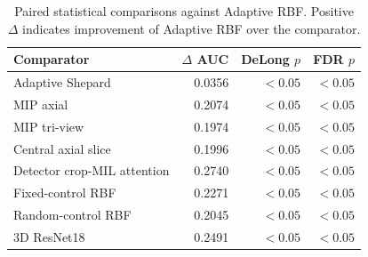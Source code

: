\documentclass[preprint,12pt]{elsarticle}
\begin{document}
\begin{table}[t]
\centering
\caption{Paired statistical comparisons against Adaptive RBF. Positive $\Delta$ indicates improvement of Adaptive RBF over the comparator.}
\label{tab:stats}
\begin{tabular}{lrrr}
\toprule
Comparator & $\Delta$ AUC & DeLong $p$ & FDR $p$ \\
\midrule
Adaptive Shepard & 0.0356 & $< 0.05$ & $< 0.05$ \\
MIP axial & 0.2074 & $< 0.05$ & $< 0.05$ \\
MIP tri-view & 0.1974 & $< 0.05$ & $< 0.05$ \\
Central axial slice & 0.1996 & $< 0.05$ & $< 0.05$ \\
Detector crop-MIL attention & 0.2740 & $< 0.05$ & $< 0.05$ \\
Fixed-control RBF & 0.2271 & $< 0.05$ & $< 0.05$ \\
Random-control RBF & 0.2045 & $< 0.05$ & $< 0.05$ \\
3D ResNet18 & 0.2491 & $< 0.05$ & $< 0.05$ \\
\bottomrule
\end{tabular}
\end{table}

\end{document}
